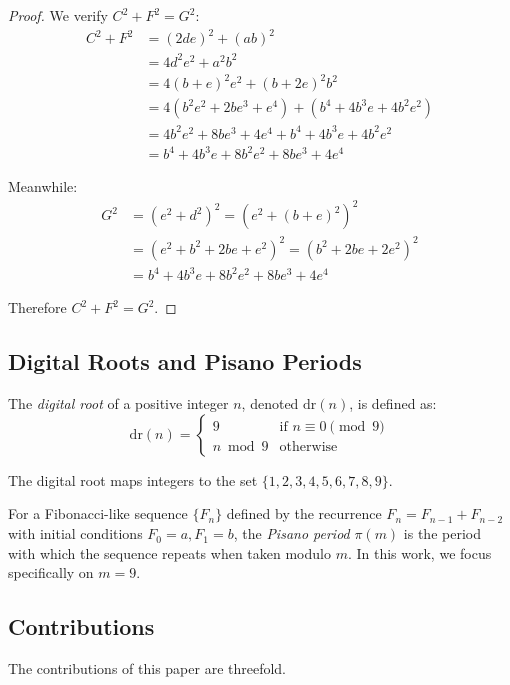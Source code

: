 \documentclass[12pt]{article}
\begin{document}
\begin{proof}
We verify $C^2 + F^2 = G^2$:
\begin{align*}
C^2 + F^2 &= (2de)^2 + (ab)^2 \\
&= 4d^2e^2 + a^2b^2 \\
&= 4(b+e)^2e^2 + (b+2e)^2b^2 \\
&= 4(b^2e^2 + 2be^3 + e^4) + (b^4 + 4b^3e + 4b^2e^2) \\
&= 4b^2e^2 + 8be^3 + 4e^4 + b^4 + 4b^3e + 4b^2e^2 \\
&= b^4 + 4b^3e + 8b^2e^2 + 8be^3 + 4e^4
\end{align*}

Meanwhile:
\begin{align*}
G^2 &= (e^2 + d^2)^2 = (e^2 + (b+e)^2)^2 \\
&= (e^2 + b^2 + 2be + e^2)^2 = (b^2 + 2be + 2e^2)^2 \\
&= b^4 + 4b^3e + 8b^2e^2 + 8be^3 + 4e^4
\end{align*}

Therefore $C^2 + F^2 = G^2$.
\end{proof}

\subsection{Digital Roots and Pisano Periods}

The \emph{digital root} of a positive integer $n$, denoted $\text{dr}(n)$, is defined as:
\begin{equation}
\text{dr}(n) = \begin{cases}
9 & \text{if } n \equiv 0 \pmod{9} \\
n \bmod 9 & \text{otherwise}
\end{cases}
\end{equation}

The digital root maps integers to the set $\{1, 2, 3, 4, 5, 6, 7, 8, 9\}$.

For a Fibonacci-like sequence $\{F_n\}$ defined by the recurrence $F_n = F_{n-1} + F_{n-2}$ with initial conditions $F_0 = a, F_1 = b$, the \emph{Pisano period} $\pi(m)$ is the period with which the sequence repeats when taken modulo $m$. In this work, we focus specifically on $m = 9$.

\subsection*{Contributions}

The contributions of this paper are threefold.
\end{document}
